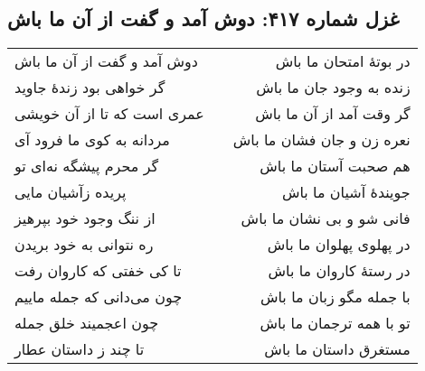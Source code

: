 \begin{center}
\section*{غزل شماره ۴۱۷: دوش آمد و گفت از آن ما باش}
\label{sec:417}
\begin{longtable}{l p{0.5cm} r}
دوش آمد و گفت از آن ما باش
&&
در بوتهٔ امتحان ما باش
\\
گر خواهی بود زندهٔ جاوید
&&
زنده به وجود جان ما باش
\\
عمری است که تا از آن خویشی
&&
گر وقت آمد از آن ما باش
\\
مردانه به کوی ما فرود آی
&&
نعره زن و جان فشان ما باش
\\
گر محرم پیشگه نه‌ای تو
&&
هم صحبت آستان ما باش
\\
پریده زآشیان مایی
&&
جویندهٔ آشیان ما باش
\\
از ننگ وجود خود بپرهیز
&&
فانی شو و بی نشان ما باش
\\
ره نتوانی به خود بریدن
&&
در پهلوی پهلوان ما باش
\\
تا کی خفتی که کاروان رفت
&&
در رستهٔ کاروان ما باش
\\
چون می‌دانی که جمله ماییم
&&
با جمله مگو زبان ما باش
\\
چون اعجمیند خلق جمله
&&
تو با همه ترجمان ما باش
\\
تا چند ز داستان عطار
&&
مستغرق داستان ما باش
\\
\end{longtable}
\end{center}
